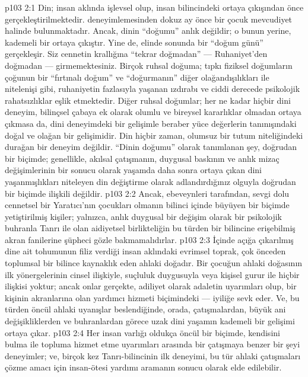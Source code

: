 \vs p103 2:1 Din; insan aklında işlevsel olup, insan bilincindeki ortaya çıkışından önce gerçekleştirilmektedir.  deneyimlemesinden dokuz ay önce bir çocuk mevcudiyet halinde bulunmaktadır. Ancak, dinin “doğumu” anlık değildir; o bunun yerine, kademeli bir ortaya çıkıştır. Yine de, elinde sonunda bir “doğum günü” gerçekleşir. Siz cennetin krallığına “tekrar doğmadan” --- Ruhaniyet’den doğmadan --- girmemektesiniz. Birçok ruhsal doğuma; tıpkı fiziksel doğumların çoğunun bir “fırtınalı doğum” ve “doğurmanın” diğer olağandışılıkları ile nitelenişi gibi, ruhaniyetin fazlasıyla yaşanan ızdırabı ve ciddi derecede psikolojik rahatsızlıklar eşlik etmektedir. Diğer ruhsal doğumlar; her ne kadar hiçbir dini deneyim, bilinçsel çabaya ek olarak olumlu ve bireysel kararlıklar olmadan ortaya çıkmasa da, dini deneyimdeki bir gelişimle beraber yüce değerlerin tanınışındaki doğal ve olağan bir gelişimidir. Din hiçbir zaman, olumsuz bir tutum niteliğindeki durağan bir deneyim değildir. “Dinin doğumu” olarak tanımlanan şey, doğrudan bir biçimde; genellikle, akılsal çatışmanın, duygusal baskının ve anlık mizaç değişimlerinin bir sonucu olarak yaşamda daha sonra ortaya çıkan dini yaşanmışlıkları niteleyen din değiştirme olarak adlandırdığınız olguyla doğrudan bir biçimde ilişkili değildir.
\vs p103 2:2 Ancak, ebeveynleri tarafından, sevgi dolu cennetsel bir Yaratıcı’nın çocukları olmanın bilinci içinde büyüyen bir biçimde yetiştirilmiş kişiler; yalnızca, anlık duygusal bir değişim olarak bir psikolojik buhranla Tanrı ile olan aidiyetsel birlikteliğin bu türden bir bilincine erişebilmiş akran fanilerine şüpheci gözle bakmamalıdırlar.
\vs p103 2:3 İçinde açığa çıkarılmış dine ait tohumunun filiz verdiği insan aklındaki evrimsel toprak, çok önceden toplumsal bir bilince kaynaklık eden ahlaki doğadır. Bir çocuğun ahlaki doğasının ilk yönergelerinin cinsel ilişkiyle, suçluluk duygusuyla veya kişisel gurur ile hiçbir ilişkisi yoktur; ancak onlar gerçekte, adiliyet olarak adaletin uyarımları olup, bir kişinin akranlarına olan yardımcı hizmeti biçimindeki --- iyiliğe sevk eder. Ve, bu türden öncül ahlaki uyanışlar beslendiğinde, orada, çatışmalardan, büyük ani değişikliklerden ve buhranlardan görece uzak dini yaşamın kademeli bir gelişimi ortaya çıkar.
\vs p103 2:4 Her insan varlığı oldukça öncül bir biçimde, kendisini bulma ile topluma hizmet etme uyarımları arasında bir çatışmaya benzer bir şeyi deneyimler; ve, birçok kez Tanrı\hyp{}bilincinin ilk deneyimi, bu tür ahlaki çatışmaları çözme amacı için insan\hyp{}ötesi yardımı aramanın sonucu olarak elde edilebilir.
